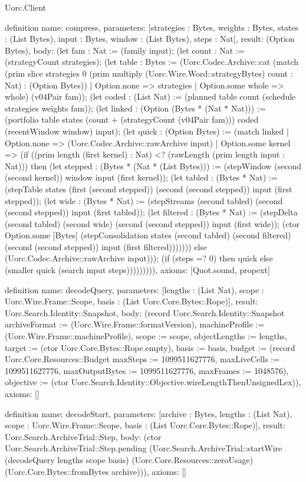 \begin{lexlean}{Uorc.Client}
\begin{semanticmodule}
definition{
  name: compress,
  parameters: [strategies : Bytes, weights : Bytes, states : (List Bytes), input : Bytes, window : (List Bytes), steps : Nat],
  result: (Option Bytes),
  body: (let fam : Nat := (family input); (let count : Nat := (strategyCount strategies); (let table : Bytes := (Uorc.Codec.Archive::cat (match (prim slice strategies 0 (prim multiply (Uorc.Wire.Word::strategyBytes) count : Nat) : (Option Bytes))
    | Option.none => strategies
    | Option.some whole => whole) (v04Pair fam)); (let coded : (List Nat) := (planned table count (schedule strategies weights fam)); (let linked : (Option (Bytes * (Nat * Nat))) := (portfolio table states (count + (strategyCount (v04Pair fam))) coded (recentWindow window) input); (let quick : (Option Bytes) := (match linked
    | Option.none => (Uorc.Codec.Archive::rawArchive input)
    | Option.some kernel => (if ((prim length (first kernel) : Nat) <? (rawLength (prim length input : Nat))) then (let stepped : (Bytes * (Nat * (List Bytes))) := (stepWindow (second (second kernel)) window input (first kernel)); (let tabled : (Bytes * Nat) := (stepTable states (first (second stepped)) (second (second stepped)) input (first stepped)); (let wide : (Bytes * Nat) := (stepStreams (second tabled) (second (second stepped)) input (first tabled)); (let filtered : (Bytes * Nat) := (stepDelta (second tabled) (second wide) (second (second stepped)) input (first wide)); (ctor Option.some [Bytes] (stepConsolidation states (second tabled) (second filtered) (second (second stepped)) input (first filtered))))))) else (Uorc.Codec.Archive::rawArchive input))); (if (steps =? 0) then quick else (smaller quick (search input steps))))))))),
  axioms: [Quot.sound, propext]
}

definition{
  name: decodeQuery,
  parameters: [lengths : (List Nat), scope : Uorc.Wire.Frame::Scope, basis : (List Uorc.Core.Bytes::Rope)],
  result: Uorc.Search.Identity::Snapshot,
  body: (record Uorc.Search.Identity::Snapshot {archiveFormat := (Uorc.Wire.Frame::formatVersion), machineProfile := (Uorc.Wire.Frame::machineProfile), scope := scope, objectLengths := lengths, target := (ctor Uorc.Core.Bytes::Rope.empty), basis := basis, budget := (record Uorc.Core.Resources::Budget {maxSteps := 1099511627776, maxLiveCells := 1099511627776, maxOutputBytes := 1099511627776, maxFrames := 1048576}), objective := (ctor Uorc.Search.Identity::Objective.wireLengthThenUnsignedLex)}),
  axioms: []
}

definition{
  name: decodeStart,
  parameters: [archive : Bytes, lengths : (List Nat), scope : Uorc.Wire.Frame::Scope, basis : (List Uorc.Core.Bytes::Rope)],
  result: Uorc.Search.ArchiveTrial::Step,
  body: (ctor Uorc.Search.ArchiveTrial::Step.pending (Uorc.Search.ArchiveTrial::startWire (decodeQuery lengths scope basis) (Uorc.Core.Resources::zeroUsage) (Uorc.Core.Bytes::fromBytes archive))),
  axioms: []
}


\end{semanticmodule}
\end{lexlean}
